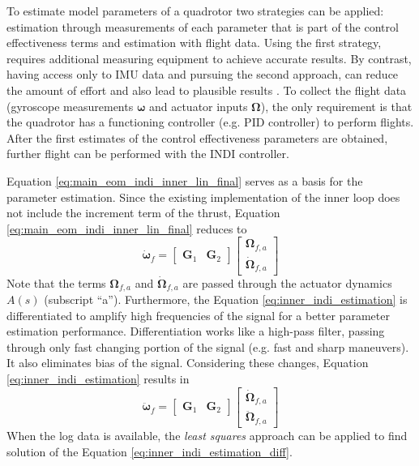 \documentclass[11pt, a4paper, twoside]{report}
\begin{document}
To estimate model parameters of a quadrotor two strategies can be applied: estimation through measurements of each parameter that is part of the control effectiveness terms and estimation with flight data. Using the first strategy, requires additional measuring equipment to achieve accurate results. By contrast, having access only to \acrshort{IMU} data and pursuing the second approach, can reduce the amount of effort and also lead to plausible results \cite{hamel}. To collect the flight data (gyroscope measurements $\bm{\omega}$ and actuator inputs $\bm{\Omega}$), the only requirement is that the quadrotor has a functioning controller (e.g. PID controller) to perform flights. After the first estimates of the control effectiveness parameters are obtained, further flight can be performed with the \acrshort{INDI} controller.  

Equation \ref{eq:main_eom_indi_inner_lin_final} serves as a basis for the  parameter estimation. Since the existing implementation of the inner loop does not include the increment term of the thrust, Equation  \ref{eq:main_eom_indi_inner_lin_final} reduces to 
\begin{equation}
	\bm{\dot{\omega}}_f = 
	\begin{bmatrix}
		\bm{G}_1 & \bm{G}_2
	\end{bmatrix} 
	\begin{bmatrix}
		\bm{\Omega}_{f,a}\\
		\bm{\dot{\Omega}}_{f,a}
	\end{bmatrix} 	
	\label{eq:inner_indi_estimation}
\end{equation}
Note that the terms $\bm{\Omega}_{f,a}$ and $\bm{\dot{\Omega}}_{f,a}$ are passed through the actuator dynamics $A(s)$ (subscript ``a''). Furthermore, the Equation \ref{eq:inner_indi_estimation} is differentiated to amplify high frequencies of the signal for a better parameter estimation performance. Differentiation works like a high-pass filter, passing through only fast changing portion of the signal (e.g. fast and sharp maneuvers). It also eliminates bias of the signal. Considering these changes, Equation \ref{eq:inner_indi_estimation} results in
\begin{equation}
	\bm{\ddot{\omega}}_f = 
	\begin{bmatrix}
		\bm{G}_1 & \bm{G}_2
	\end{bmatrix} 
	\begin{bmatrix}
		\bm{\dot{\Omega}}_{f,a}\\
		\bm{\ddot{\Omega}}_{f,a}
	\end{bmatrix} 	
	\label{eq:inner_indi_estimation_diff}
\end{equation}
When the log data is available, the \textit{least squares} approach can be applied to find solution of the Equation \ref{eq:inner_indi_estimation_diff}.
\end{document}
